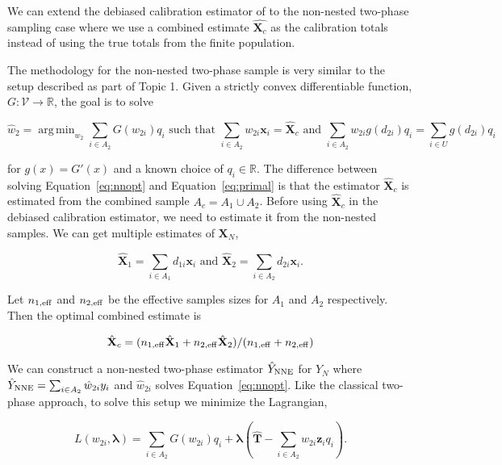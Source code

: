 \documentclass[12pt]{article}
\DeclareMathOperator*{\argmin}{arg\,min}
\renewcommand{\bf}[1]{\mathbf{#1}}
\begin{document}
We can extend the debiased calibration estimator of \cite{kwon2024debiased} to
the non-nested two-phase sampling case where we use a combined estimate
$\hat{\bm X_c}$ as the calibration totals instead of using the true totals from
the finite population.


The methodology for the non-nested two-phase sample is very similar to the setup
described as part of Topic 1. Given a strictly convex differentiable function,
$G: \mathcal{V} \to \mathbb{R}$, the goal is to solve

\begin{equation}\label{eq:nnopt}
\hat w_2 = \argmin_{w_2} \sum_{i \in A_2} G\left(w_{2i}\right) q_i 
\text{ such that } 
\sum_{i \in A_2} w_{2i} \bf x_i = \hat{\bf X}_{c} \text{ and } 
\sum_{i \in A_2} w_{2i} g(d_{2i}) q_i = \sum_{i \in U} g(d_{2i}) q_i
\end{equation}

for $g(x) = G'(x)$ and a known choice of $q_i \in \mathbb{R}$. 
The difference
between solving Equation~\ref{eq:nnopt} and Equation~\ref{eq:primal} is that the
estimator $\hat{\bf X}_c$ is estimated from the combined sample $A_c = A_1 \cup
A_2$. Before using $\hat{\bf X}_c$ in the debiased calibration estimator, we
need to estimate it from the non-nested samples. We can get multiple estimates
of $\bf X_N$, 

$$
\hat{\bf X}_1 = \sum_{i \in A_1} d_{1i} \bf x_i \text{ and }
\hat{\bf X}_2 = \sum_{i \in A_2} d_{2i} \bf x_i.
$$

Let $n_{1, \rm{eff}}$ and $n_{2, \rm{eff}}$ be the effective samples sizes for
$A_1$ and $A_2$ respectively. Then the optimal combined estimate is 

$$
\hat{\bf X}_c = (n_{1, \rm{eff}} \hat{\bf X}_1 + n_{2, \rm{eff}}\hat{\bf X}_2) / 
(n_{1, \rm{eff}} + n_{2, \rm{eff}})
$$

We can construct a non-nested two-phase estimator $\hat Y_{\rm NNE}$ for $Y_N$ where
$\hat Y_{\rm NNE} = \sum_{i \in A_2} \hat w_{2i} y_i$ and $\hat w_{2i}$ solves
Equation~\ref{eq:nnopt}. Like the classical two-phase approach, to solve this
setup we minimize the Lagrangian,

\begin{equation}\label{eq:legragedc2}
  L(w_{2i}, \bm \lambda) = \sum_{i \in A_2} G(w_{2i}) q_i + 
  \bm \lambda \left( \hat{\bf T} - \sum_{i \in A_2} w_{2i} \bf z_i q_i\right).
\end{equation}
\end{document}
